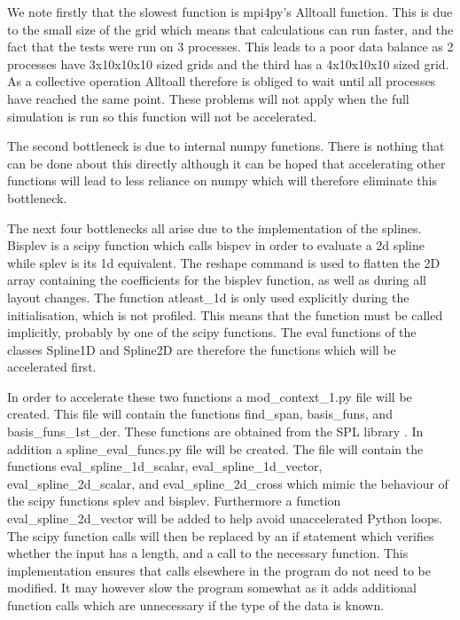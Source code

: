 We note firstly that the slowest function is mpi4py’s Alltoall function. This is due to the small size of the grid which means that calculations can run faster, and the fact that the tests were run on 3 processes. This leads to a poor data balance as 2 processes have 3x10x10x10 sized grids and the third has a 4x10x10x10 sized grid. As a collective operation Alltoall therefore is obliged to wait until all processes have reached the same point. These problems will not apply when the full simulation is run so this function will not be accelerated. 

The second bottleneck is due to internal numpy functions. There is nothing that can be done about this directly although it can be hoped that accelerating other functions will lead to less reliance on numpy which will therefore eliminate this bottleneck.

The next four bottlenecks all arise due to the implementation of the splines. Bisplev is a scipy function which calls bispev in order to evaluate a 2d spline while splev is its 1d equivalent. The reshape command is used to flatten the 2D array containing the coefficients for the bisplev function, as well as during all layout changes. The function atleast\_1d  is  only used explicitly during the initialisation, which is not profiled. This means that the function must be called implicitly,  probably by one of the scipy functions. The eval functions of the classes Spline1D and Spline2D are therefore the functions which will be accelerated first.

In order to accelerate these two functions a mod\_context\_1.py file will be created. This file will contain the functions find\_span, basis\_funs, and basis\_funs\_1st\_der. These functions are obtained from the SPL library \cite{Python SPL}.  In addition a spline\_eval\_funcs.py file will be created. The file will contain the functions eval\_spline\_1d\_scalar, eval\_spline\_1d\_vector, eval\_spline\_2d\_scalar, and eval\_spline\_2d\_cross which mimic the behaviour of the scipy functions splev and bisplev. Furthermore a function eval\_spline\_2d\_vector will be added to help avoid unaccelerated Python loops. The scipy function calls will then be replaced by an if statement which verifies whether the input has a length, and a call to the necessary function. This implementation ensures that calls elsewhere in the program do not need to be modified. It may however slow the program somewhat as it adds additional function calls which are unnecessary if the type of the data is known.

